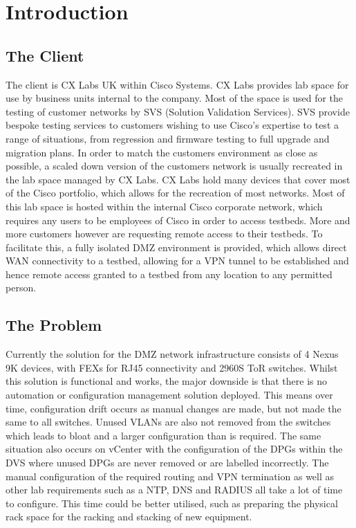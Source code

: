 \chapter{Introduction}
\label{chap:intro}

\section{The Client}
\label{intro:client}

The client is CX Labs UK within Cisco Systems. CX Labs provides lab space for
use by business units internal to the company. Most of the space is used for
the testing of customer networks by SVS (Solution Validation Services). SVS
provide bespoke testing services to customers wishing to use Cisco’s expertise
to test a range of situations, from regression and firmware testing to full
upgrade and migration plans.\newline
In order to match the customers environment as close as possible, a scaled down
version of the customers network is usually recreated in the lab space managed
by CX Labs. CX Labs hold many devices that cover most of the Cisco portfolio,
which allows for the recreation of most networks. Most of this lab space is
hosted within the internal Cisco corporate network, which requires any users to
be employees of Cisco in order to access testbeds. More and more customers
however are requesting remote access to their testbeds. To facilitate this, a
fully isolated DMZ environment is provided, which allows direct WAN
connectivity to a testbed, allowing for a VPN tunnel to be established and
hence remote access granted to a testbed from any location to any permitted
person.

\section{The Problem}
\label{intro:problem}

Currently the solution for the DMZ network infrastructure consists of 4 Nexus
9K devices, with FEXs for RJ45 connectivity and 2960S ToR switches. Whilst this
solution is functional and works, the major downside is that there is no
automation or configuration management solution deployed. This means over time,
configuration drift occurs as manual changes are made, but not made the same to
all switches. Unused VLANs are also not removed from the switches which leads
to bloat and a larger configuration than is required. The same situation also
occurs on vCenter with the configuration of the DPGs within the DVS where
unused DPGs are never removed or are labelled incorrectly.\newline
The manual configuration of the required routing and VPN termination as well as
other lab requirements such as a NTP, DNS and RADIUS all take a lot of time to
configure. This time could be better utilised, such as preparing the physical
rack space for the racking and stacking of new equipment.

